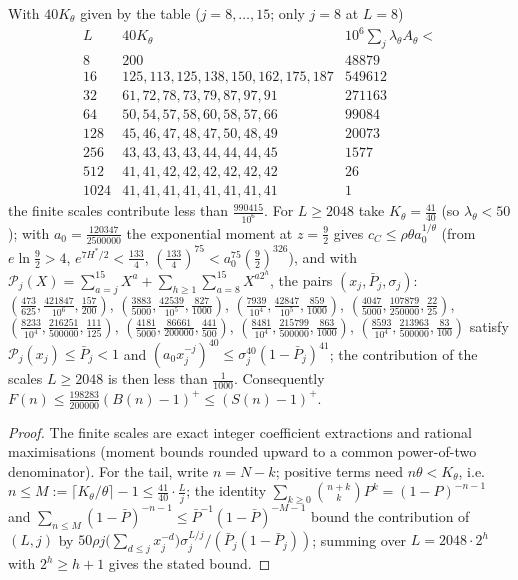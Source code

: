 \begin{lemma}\label{lem:h883-8}
With $40K_\theta$ given by the table ($j=8,\dots,15$; only $j=8$ at $L=8$)
\[
\begin{array}{c|l|r}
L&40K_\theta&10^6\sum_j\lambda_\theta A_\theta<\\\hline
8&200&48879\\
16&125,113,125,138,150,162,175,187&549612\\
32&61,72,78,73,79,87,97,91&271163\\
64&50,54,57,58,60,58,57,66&99084\\
128&45,46,47,48,47,50,48,49&20073\\
256&43,43,43,43,44,44,44,45&1577\\
512&41,41,42,42,42,42,42,42&26\\
1024&41,41,41,41,41,41,41,41&1
\end{array}
\]
the finite scales contribute less than $\tfrac{990415}{10^6}$. For $L\ge2048$ take $K_\theta=\tfrac{41}{40}$
(so $\lambda_\theta<50$); with $a_0=\tfrac{120347}{2500000}$ the exponential moment at $z=\tfrac92$ gives
$c_C\le\rho\theta a_0^{1/\theta}$ (from $e\ln\tfrac92>4$, $e^{7H^*/2}<\tfrac{133}4$,
$(\tfrac{133}4)^{75}<a_0^{75}(\tfrac92)^{326}$), and with
$\mathcal P_j(X)=\sum_{a=j}^{15}X^a+\sum_{h\ge1}\sum_{a=8}^{15}X^{a2^h}$, the pairs
$(x_j,\bar P_j,\sigma_j)$: $(\tfrac{473}{625},\tfrac{421847}{10^6},\tfrac{157}{200})$,
$(\tfrac{3883}{5000},\tfrac{42539}{10^5},\tfrac{827}{1000})$, $(\tfrac{7939}{10^4},\tfrac{42847}{10^5},\tfrac{859}{1000})$,
$(\tfrac{4047}{5000},\tfrac{107879}{250000},\tfrac{22}{25})$, $(\tfrac{8233}{10^4},\tfrac{216251}{500000},\tfrac{111}{125})$,
$(\tfrac{4181}{5000},\tfrac{86661}{200000},\tfrac{441}{500})$, $(\tfrac{8481}{10^4},\tfrac{215799}{500000},\tfrac{863}{1000})$,
$(\tfrac{8593}{10^4},\tfrac{213963}{500000},\tfrac{83}{100})$ satisfy $\mathcal P_j(x_j)\le\bar P_j<1$ and
$(a_0x_j^{-j})^{40}\le\sigma_j^{40}(1-\bar P_j)^{41}$; the contribution of the scales $L\ge2048$ is then less than
$\tfrac1{1000}$. Consequently $F(n)\le\tfrac{198283}{200000}(B(n)-1)^+\le(S(n)-1)^+$.
\end{lemma}
\begin{proof}
The finite scales are exact integer coefficient extractions and rational maximisations (moment bounds rounded upward
to a common power-of-two denominator). For the tail, write $n=N-k$; positive terms need $n\theta<K_\theta$, i.e.\
$n\le M:=\lceil K_\theta/\theta\rceil-1\le\tfrac{41}{40}\cdot\tfrac Lj$; the identity
$\sum_{k\ge0}\binom{n+k}kP^k=(1-P)^{-n-1}$ and $\sum_{n\le M}(1-\bar P)^{-n-1}\le\bar P^{-1}(1-\bar P)^{-M-1}$ bound
the contribution of $(L,j)$ by $50\rho j\bigl(\sum_{d\le j}x_j^{-d}\bigr)\sigma_j^{L/j}/(\bar P_j(1-\bar P_j))$; summing
over $L=2048\cdot2^h$ with $2^h\ge h+1$ gives the stated bound.
\end{proof}

